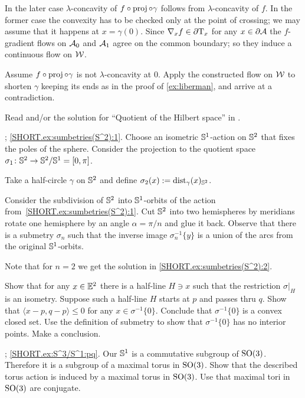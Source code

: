 In the later case $\lambda$-concavity of $f\circ\operatorname{\rm proj}\nolimits\circ\gamma$ follows from $\lambda$-concavity of $f$.
In the former case the convexity has to be checked only at the point of crossing;
we may assume that it happens at $x=\gamma(0)$.
Since $\nabla_xf\in\partial\mathrm{T}_x$ for any $x\in\partial\mathcal{A}$ the $f$-gradient flows on $\mathcal{A}_0$ and $\mathcal{A}_1$ agree on the common boundary; so they induce a continuous flow on $\mathcal{W}$.

Assume $f\circ\operatorname{\rm proj}\nolimits\circ\gamma$ is not $\lambda$-concavity at $0$.
Apply the constructed flow on $\mathcal{W}$ to shorten $\gamma$ keeping its ends as in the proof of \ref{ex:liberman},
and arrive at a contradiction.

 Read \cite[Section 4]{terng-thorbergsson} and/or the solution for ``Quotient of the Hilbert space'' in \cite{petrunin2020}.

\parbf{\ref{ex:sumbetries(S^2)}}; \ref{SHORT.ex:sumbetries(S^2):1}.
Choose an isometric $\mathbb{S}^1$-action on $\mathbb{S}^2$ that fixes the poles of the sphere.
Consider the projection to the quotient space $\sigma_1\colon\mathbb{S}^2\to \mathbb{S}^2/\mathbb{S}^1=[0,\pi]$.

Take a half-circle $\gamma$ on $\mathbb{S}^2$ and define 
$\sigma_2(x)\mathrel{:=}\mathrm{dist}_\gamma(x)_{\mathbb{S}^2}$.

Consider the subdivision of $\mathbb{S}^2$ into $\mathbb{S}^1$-orbits of the action from~\ref{SHORT.ex:sumbetries(S^2):1}.
Cut $\mathbb{S}^2$ into two hemispheres by meridians rotate one hemisphere by an angle $\alpha=\pi/n$ and glue it back.
Observe that there is a submetry $\sigma_n$ such that the inverse image $\sigma_n^{-1}\{y\}$ is a union of the arcs from the original $\mathbb{S}^1$-orbits.

Note that for $n=2$ we get the solution in \ref{SHORT.ex:sumbetries(S^2):2}.

Show that for any $x\in\mathbb{E}^2$ there is a half-line $H\ni x$ such that 
the restriction $\sigma|_H$ is an isometry.
Suppose such a half-line $H$ starts at $p$ and passes thru $q$.
Show that $\langle x-p,q-p \rangle\le 0$ for any $x\in \sigma^{-1}\{0\}$.
Conclude that $\sigma^{-1}\{0\}$ is a convex closed set.
Use the definition of submetry to show that  $\sigma^{-1}\{0\}$ has no interior points.
Make a conclusion.

\parbf{\ref{ex:S^3/S^1}};
\ref{SHORT.ex:S^3/S^1:pq}.
Our $\mathbb{S}^1$ is a commutative subgroup of $\mathrm{SO}(3)$.
Therefore it is a subgroup of a maximal torus in $\mathrm{SO}(3)$.
Show that the described torus action is induced by a maximal torus in $\mathrm{SO}(3)$.
Use that maximal tori in $\mathrm{SO}(3)$ are conjugate.

